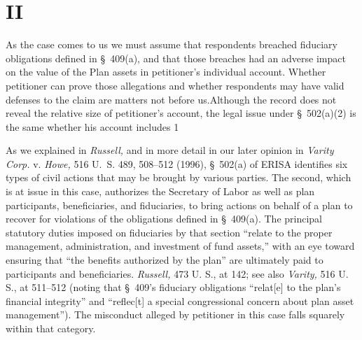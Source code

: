 {\section{II}

  As the case comes to us we must assume that respondents breached fiduciary obligations defined in \S~409(a), and that \newpage  those breaches had an adverse impact on the value of the Plan assets in petitioner's individual account. Whether petitioner can prove those allegations and whether respondents may have valid defenses to the claim are matters not before us.\footnotemark[3] Although the record does not reveal the relative size of petitioner's account, the legal issue under \S~502(a)(2) is the same whether his account includes 1%

  As we explained in \emph{Russell,} and in more detail in our later opinion in \emph{Varity Corp.} v. \emph{Howe,} 516 U.~S. 489, 508--512 (1996), \S~502(a) of ERISA identifies six types of civil actions that may be brought by various parties. The second, which is at issue in this case, authorizes the Secretary of Labor as well as plan participants, beneficiaries, and fiduciaries, to bring actions on behalf of a plan to recover for violations of the obligations defined in \S~409(a). The principal statutory duties imposed on fiduciaries by that section ``relate to the proper management, administration, and investment of fund assets,'' with an eye toward ensuring that ``the benefits authorized by the plan'' are ultimately paid to participants and beneficiaries. \emph{Russell,} 473 U. S., at 142; see also \emph{Varity,} 516 U. S., at 511--512 (noting that \S~409's fiduciary obligations ``relat[e] to the plan's financial integrity'' and ``reflec[t] a special congressional concern about plan asset management''). The misconduct alleged by petitioner in this case falls squarely within that category.\footnotemark[4]\newpage



}
